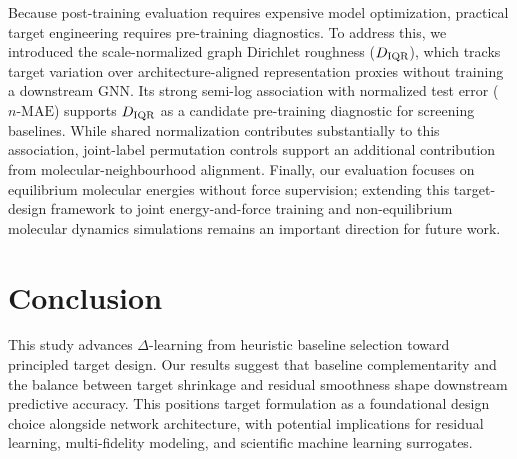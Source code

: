 Because post-training evaluation requires expensive model optimization, practical target engineering requires pre-training diagnostics. To address this, we introduced the scale-normalized graph Dirichlet roughness ($D_{\rm IQR}$), which tracks target variation over architecture-aligned representation proxies without training a downstream GNN. Its strong semi-log association with normalized test error ($n\text{-MAE}$) supports $D_{\rm IQR}$ as a candidate pre-training diagnostic for screening baselines. While shared normalization contributes substantially to this association, joint-label permutation controls support an additional contribution from molecular-neighbourhood alignment. Finally, our evaluation focuses on equilibrium molecular energies without force supervision; extending this target-design framework to joint energy-and-force training and non-equilibrium molecular dynamics simulations remains an important direction for future work.

\section{Conclusion}
\label{sec:conclusion}

This study advances $\Delta$-learning from heuristic baseline selection toward principled target design. Our results suggest that baseline complementarity and the balance between target shrinkage and residual smoothness shape downstream predictive accuracy. This positions target formulation as a foundational design choice alongside network architecture, with potential implications for residual learning, multi-fidelity modeling, and scientific machine learning surrogates.
